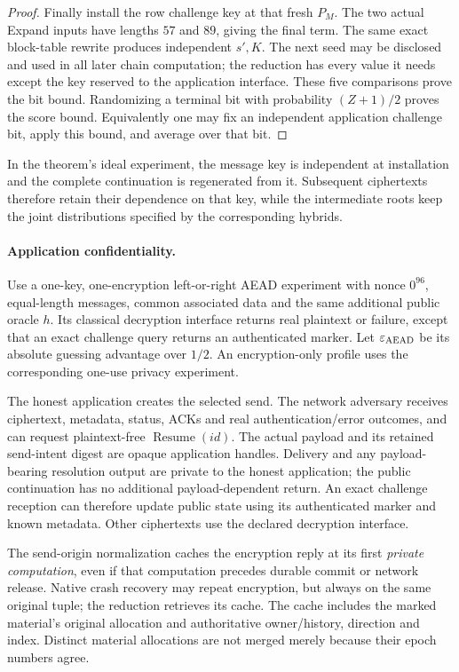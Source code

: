 \documentclass[pdflatex]{sn-jnl}
\theoremstyle{thmstyleone}
\theoremstyle{thmstylethree}
\theoremstyle{thmstyletwo}
\begin{document}
\begin{proof}
Finally install the row challenge key at that fresh $P_M$. The two actual
Expand inputs have lengths $57$ and $89$, giving the final term.
The same exact block-table rewrite produces independent $s',K$.
The next seed may be disclosed and used in all later chain computation;
the reduction has every value it needs except the key reserved to the
application interface. These five comparisons prove the bit bound.
Randomizing a terminal bit with probability $(Z+1)/2$ proves the score
bound. Equivalently one may fix an independent application challenge bit,
apply this bound, and average over that bit.
\end{proof}

In the theorem's ideal experiment, the message key is independent at
installation and the complete continuation is regenerated from it.
Subsequent ciphertexts therefore retain their dependence on that key,
while the intermediate roots keep the joint distributions specified by
the corresponding hybrids.

\paragraph{Application confidentiality.}
Use a one-key, one-encryption left-or-right AEAD experiment with nonce
$0^{96}$, equal-length messages, common associated data and the same
additional public oracle $h$. Its classical decryption interface returns
real plaintext or failure, except that an exact challenge query returns
an authenticated marker. Let $\varepsilon_{\rm AEAD}$ be its absolute
guessing advantage over $1/2$. An encryption-only profile uses the
corresponding one-use privacy experiment.

The honest application creates the selected send. The network adversary
receives ciphertext, metadata, status, ACKs and real authentication/error
outcomes, and can request plaintext-free $\operatorname{Resume}(id)$.
The actual payload and its retained send-intent digest are opaque
application handles. Delivery and any payload-bearing resolution output
are private to the honest application; the public continuation has no
additional payload-dependent return. An exact challenge reception can
therefore update public state using its authenticated marker and known
metadata. Other ciphertexts use the declared decryption interface.

The send-origin normalization caches the encryption reply at its first
\emph{private computation}, even if that computation precedes durable
commit or network release. Native crash recovery may repeat encryption,
but always on the same original tuple; the reduction retrieves its cache.
The cache includes the marked material's original allocation and
authoritative owner/history, direction and index. Distinct material
allocations are not merged merely because their epoch numbers agree.
\end{document}
